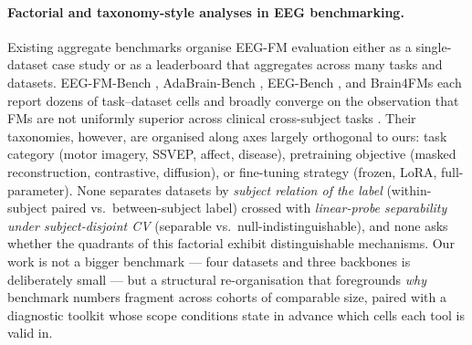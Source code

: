 \paragraph{Factorial and taxonomy-style analyses in EEG benchmarking.}
Existing aggregate benchmarks organise EEG-FM evaluation either as a
single-dataset case study or as a leaderboard that aggregates across
many tasks and datasets. EEG-FM-Bench \citep{eegfmbench2025},
AdaBrain-Bench \citep{adabrain2025}, EEG-Bench \citep{eegbench2025},
and Brain4FMs \citep{brain4fms2026} each report dozens of
task--dataset cells and broadly converge on the observation that
FMs are not uniformly superior across clinical cross-subject tasks
\citep{kauffmann2025critique,eegchallenge2025}. Their taxonomies,
however, are organised along axes largely orthogonal to ours: task
category (motor imagery, SSVEP, affect, disease), pretraining
objective (masked reconstruction, contrastive, diffusion), or
fine-tuning strategy (frozen, LoRA, full-parameter). None separates
datasets by \emph{subject relation of the label} (within-subject
paired vs.\ between-subject label) crossed with \emph{linear-probe
separability under subject-disjoint CV} (separable vs.\
null-indistinguishable), and none asks whether the quadrants of this
factorial exhibit distinguishable mechanisms. Our work is not a
bigger benchmark --- four datasets and three backbones is deliberately
small --- but a structural re-organisation that foregrounds
\emph{why} benchmark numbers fragment across cohorts of comparable
size, paired with a diagnostic toolkit whose scope conditions state
in advance which cells each tool is valid in.
